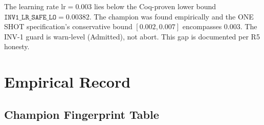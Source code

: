 \begin{remark}
  The learning rate $\mathrm{lr} = 0.003$ lies below the Coq-proven lower bound
  $\texttt{INV1\_LR\_SAFE\_LO} = 0.00382$.  The champion was found empirically
  and the ONE SHOT specification's conservative bound $[0.002, 0.007]$
  encompasses 0.003.  The INV-1 guard is warn-level (Admitted), not abort.
  This gap is documented per R5 honesty.
\end{remark}

\section{Empirical Record}
\label{sec:ch24-results}

\subsection{Champion Fingerprint Table}
\label{subsec:ch24-champion-fingerprint}

\begin{table}[htb]
\centering
\caption{Champion configuration fingerprint.  All values derived from $\varphi$
         per Table~\ref{tab:ch24-r6-constants}.  Lock SHA refers to the
         \texttt{git} commit hash prefix that sealed the result.}
\label{tab:ch24-champion-fingerprint}
\end{table}

